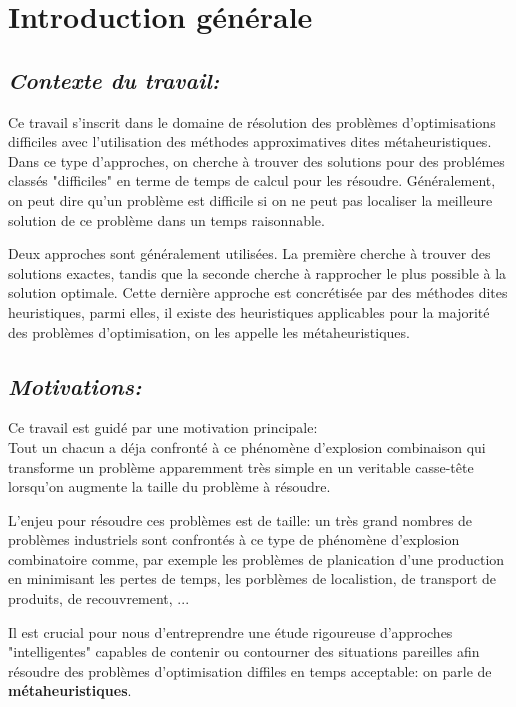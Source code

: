 \documentclass[a4paper,11pt,oneside]{report}
\theoremstyle{plain}
\newcommand{\0}{/ \! \! \! 0}
\theoremstyle{plain}
\begin{document}
\tableofcontents
\listoffigures
\listoftables


\chapter*{Introduction g\'en\'erale}
\section*{\it Contexte du travail:}  
Ce travail s'inscrit dans le domaine de r\'esolution des probl\`emes d'optimisations difficiles avec l'utilisation des m\'ethodes approximatives 
dites m\'etaheuristiques. Dans ce type d'approches, on cherche \`a trouver des solutions pour des probl\'emes class\'es "difficiles" en terme de temps de 
calcul pour les r\'esoudre. G\'en\'eralement, on peut dire qu'un probl\`eme est difficile si on ne peut pas localiser la meilleure solution de ce 
probl\`eme dans un temps raisonnable. 


Deux approches sont g\'en\'eralement utilis\'ees. La premi\`ere cherche \`a trouver des
solutions exactes, tandis que la seconde cherche \`a rapprocher le plus possible \`a la solution optimale. Cette derni\`ere approche est concr\'etis\'ee
par des m\'ethodes dites heuristiques, parmi elles, il existe des heuristiques applicables pour la majorit\'e des probl\`emes d'optimisation, on les
appelle les m\'etaheuristiques.
\section*{\it Motivations:}
Ce travail est guid\'e par une motivation principale:\\

   Tout un chacun a d\'eja confront\'e \`a ce ph\'enom\`ene d'explosion combinaison qui transforme un probl\`eme apparemment tr\`es simple en un veritable 
   casse-t\^ete lorsqu'on augmente la taille du probl\`eme  \`a r\'esoudre.

L'enjeu pour r\'esoudre ces probl\`emes est de taille: un tr\`es grand nombres de probl\`emes industriels sont confront\'es \`a ce type de ph\'enom\`ene 
d'explosion combinatoire comme, par exemple les probl\`emes de planication d'une production en minimisant les pertes de temps, les porbl\`emes de
localistion, de transport de produits, de recouvrement, ...

Il est crucial pour nous d'entreprendre une \'etude rigoureuse d'approches "intelligentes" capables de contenir ou contourner des situations pareilles 
afin r\'esoudre des probl\`emes d'optimisation diffiles en temps acceptable: on parle de {\bf m\'etaheuristiques}.
\end{document}
